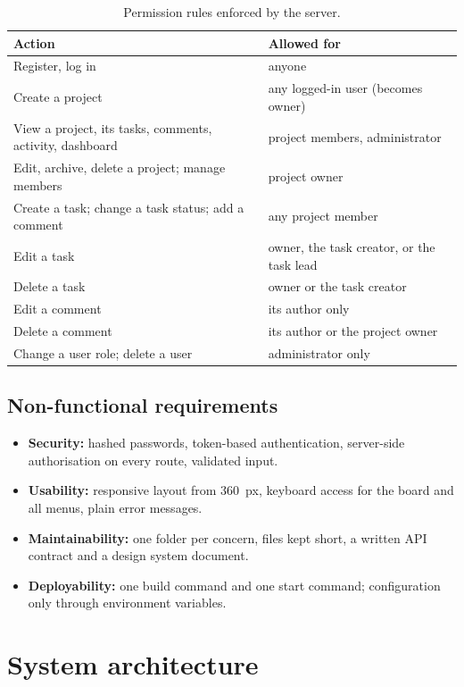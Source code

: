 \documentclass[11pt,a4paper]{article}
\begin{document}
\begin{table}[H]
\centering\small
\begin{tabular}{@{}p{7.2cm}p{8.2cm}@{}}
\toprule
\textbf{Action} & \textbf{Allowed for}\\
\midrule
Register, log in & anyone\\
Create a project & any logged-in user (becomes owner)\\
View a project, its tasks, comments, activity, dashboard & project members, administrator\\
Edit, archive, delete a project; manage members & project owner\\
Create a task; change a task status; add a comment & any project member\\
Edit a task & owner, the task creator, or the task lead\\
Delete a task & owner or the task creator\\
Edit a comment & its author only\\
Delete a comment & its author or the project owner\\
Change a user role; delete a user & administrator only\\
\bottomrule
\end{tabular}
\caption{Permission rules enforced by the server.}
\end{table}

\subsection{Non-functional requirements}
\begin{itemize}
  \item \textbf{Security:} hashed passwords, token-based authentication, server-side authorisation on every route, validated input.
  \item \textbf{Usability:} responsive layout from 360~px, keyboard access for the board and all menus, plain error messages.
  \item \textbf{Maintainability:} one folder per concern, files kept short, a written API contract and a design system document.
  \item \textbf{Deployability:} one build command and one start command; configuration only through environment variables.
\end{itemize}

\section{System architecture}
\end{document}
